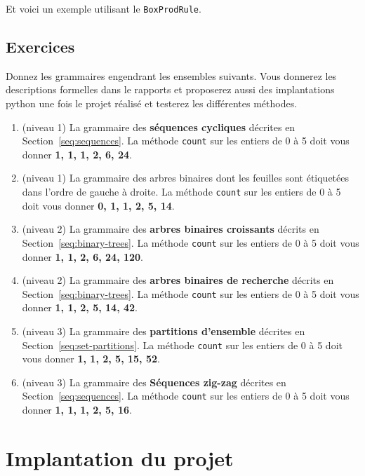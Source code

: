 \documentclass[11pt]{article}
\renewcommand{\emph}[1]{\textbf{#1}}
\newcommand{\BoxProdRule}{\texttt{BoxProdRule}\xspace}
\newcommand{\cnt}{\texttt{count}\xspace}
\begin{document}


Et voici un exemple utilisant le \BoxProdRule.



\subsection{Exercices}

Donnez les grammaires engendrant les ensembles suivants. Vous donnerez
les descriptions formelles dans le rapports et proposerez aussi
des implantations python une fois le projet réalisé et testerez
les différentes méthodes.

\begin{enumerate}
\item (niveau 1) La grammaire des \emph{séquences cycliques} décrites en
  Section~\ref{seq:sequences}.  La méthode \cnt sur les entiers de 0 à 5
  doit vous donner \textbf{1, 1, 1, 2, 6, 24}.
\item (niveau 1) La grammaire des arbres binaires dont les feuilles sont
  étiquetées dans l'ordre de gauche à droite.  La méthode \cnt sur les
  entiers de 0 à 5 doit vous donner \textbf{0, 1, 1, 2, 5, 14}.
\item (niveau 2) La grammaire des \emph{arbres binaires croissants} décrits en
  Section~\ref{seq:binary-trees}.  La méthode \cnt sur les entiers de 0 à 5
  doit vous donner \textbf{1, 1, 2, 6, 24, 120}.
\item (niveau 2) La grammaire des \emph{arbres binaires de recherche} décrits
  en Section~\ref{seq:binary-trees}.  La méthode \cnt sur les entiers de 0 à
  5 doit vous donner \textbf{1, 1, 2, 5, 14, 42}.
\item (niveau 3) La grammaire des \emph{partitions d'ensemble} décrites en
  Section~\ref{seq:set-partitions}.  La méthode \cnt sur les entiers de 0 à
  5 doit vous donner \textbf{1, 1, 2, 5, 15, 52}.
\item (niveau 3) La grammaire des \emph{Séquences zig-zag} décrites en
  Section~\ref{seq:sequences}.  La méthode \cnt sur les entiers de 0 à 5
  doit vous donner \textbf{1, 1, 1, 2, 5, 16}.
\end{enumerate}

\section{Implantation du projet}
\end{document}
